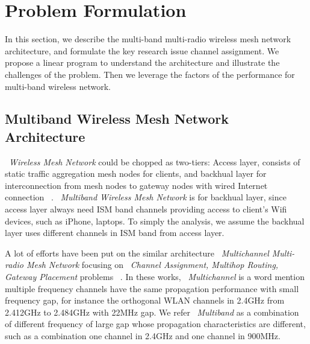 \section{Problem Formulation}
\label{sec:problemformulation}

In this section, we describe the multi-band multi-radio wireless mesh network architecture, and formulate the key research issue channel assignment. 
We propose a linear program to understand the architecture and illustrate the challenges of the problem.
Then we leverage the factors of the performance for multi-band wireless network.
 
\subsection{Multiband Wireless Mesh Network Architecture}
\label{subsec:architecture}
~\emph{Wireless Mesh Network} could be chopped as two-tiers:
Access layer, consists of static traffic aggregation mesh nodes for clients, and backhual layer for interconnection from mesh nodes to gateway nodes with wired Internet connection ~\cite{akyildiz2005wireless}. 
~\emph{Multiband Wireless Mesh Network} is for backhual layer, since access layer always need ISM band channels providing access to client's Wifi devices, such as iPhone, laptops. To simply the analysis, we assume the backhual layer uses different channels in ISM band from access layer.

A lot of efforts have been put on the similar architecture ~\emph{Multichannel Multi-radio Mesh Network} focusing on ~\emph{Channel Assignment, Multihop Routing, Gateway Placement} problems ~\cite{si2010overview}.
In these works, ~\emph{Multichannel} is a word mention multiple frequency channels have the same propagation performance with small frequency gap, for instance the orthogonal WLAN channels in 2.4GHz from 2.412GHz to 2.484GHz with 22MHz gap.
We refer ~\emph{Multiband} as a combination of different frequency of large gap whose propagation characteristics are different, such as a combination one channel in 2.4GHz and one channel in 900MHz.

